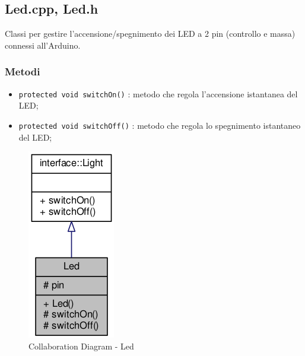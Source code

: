 \newpage
\subsection{Led.cpp, Led.h}
Classi per gestire l'accensione/spegnimento dei LED a 2 pin (controllo e massa) connessi all'Arduino.
\subsubsection{Metodi}
\begin{itemize}
	\item \texttt{protected	void switchOn()} : metodo che regola l'accensione istantanea del LED;
	\item \texttt{protected	void switchOff()} : metodo che regola lo spegnimento istantaneo del LED;
\end{itemize}
\begin{figure}[!ht]
	\centering
	\includegraphics[scale=.5]{img/UML/CollaborationDiagram/Led.png}
	\caption{Collaboration Diagram - Led}
\end{figure}
